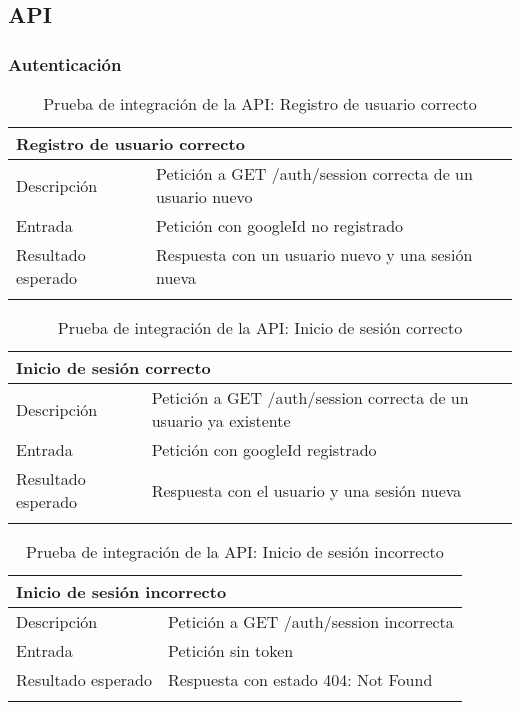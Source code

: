 \subsection{API}

\subsubsection{Autenticación}

\begin{longtable}{|p{} p{}|}
    \hline
    \multicolumn{2}{|l|}{\textbf{Registro de usuario correcto}} \\ \hline 
    Descripción                 & Petición a GET /auth/session correcta de un usuario nuevo \\ \hline
    Entrada                     & Petición con googleId no registrado \\ \hline
    Resultado esperado          & Respuesta con un usuario nuevo y una sesión nueva \\ \hline
    \caption{Prueba de integración de la API: Registro de usuario correcto}
    \label{cp:i:api:registro_usuario_correcto}
\end{longtable}

\begin{longtable}{|p{} p{}|}
    \hline
    \multicolumn{2}{|l|}{\textbf{Inicio de sesión correcto}} \\ \hline 
    Descripción                 & Petición a GET /auth/session correcta de un usuario ya existente \\ \hline
    Entrada                     & Petición con googleId registrado \\ \hline
    Resultado esperado          & Respuesta con el usuario y una sesión nueva \\ \hline
    \caption{Prueba de integración de la API: Inicio de sesión correcto}
    \label{cp:i:api:inicio_sesion_correcto}
\end{longtable}

\begin{longtable}{|p{} p{}|}
    \hline
    \multicolumn{2}{|l|}{\textbf{Inicio de sesión incorrecto}} \\ \hline 
    Descripción                 & Petición a GET /auth/session incorrecta \\ \hline
    Entrada                     & Petición sin token \\ \hline
    Resultado esperado          & Respuesta con estado 404: Not Found \\ \hline
    \caption{Prueba de integración de la API: Inicio de sesión incorrecto}
    \label{cp:i:api:inicio_sesion_incorrecto}
\end{longtable}

